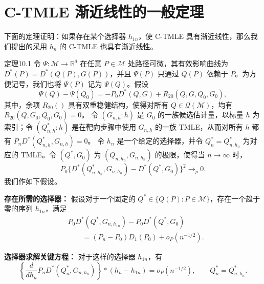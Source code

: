\section{C-TMLE 渐近线性的一般定理}
\label{sec:ch10-asymptotic-linearity}

下面的定理证明：如果存在某个选择器 $h_{1n}$，使 C-TMLE 具有渐近线性，那么我们提出的采用 $h_n$ 的 C-TMLE 也具有渐近线性。

\begin{bookresult}{定理}{10.1}
令 $\Psi:\mathcal M\to\mathbb R^d$ 在任意 $P\in\mathcal M$ 处路径可微，其有效影响曲线为
$D^*(P)=D^*(Q(P),G(P))$，并且 $\Psi(P)$ 只通过 $Q(P)$ 依赖于 $P$。为方便记号，我们也将 $\Psi(P)$ 记为 $\Psi(Q)$。假设
\[
 \Psi(Q)-\Psi(Q_0)
 =-P_0D^*(Q,G)+R_{20}(Q,G,Q_0,G_0),
\]
其中，余项 $R_{20}()$ 具有双重稳健结构，使得对所有 $Q\in\mathcal Q(\mathcal M)$，均有
$R_{20}(Q,G_0,Q_0,G_0)=0$。
令 $(G_{n,h}:h)$ 是 $G_0$ 的一族候选估计量，以标量 $h$ 为索引；令 $(Q_{n,h}^*:h)$ 是在靶向步骤中使用 $G_{n,h}$ 的一族 TMLE，从而对所有 $h$ 都有
$P_nD^*(Q_{n,h}^*,G_{n,h})=0$。
令 $h_n$ 是一个给定的选择器，并令 $Q_n^*=Q_{n,h_n}^*$ 为对应的 TMLE。令 $(Q^*,G_0)$ 为 $(Q_{n,h_n},G_{n,h_n})$ 的极限，使得当 $n\to\infty$ 时，
\[
 P_0\{D^*(Q_{n,h_n}^*,G_{n,h_n})-D^*(Q^*,G_0)\}^2
 \longrightarrow_p0.
\]
我们作如下假设。

\noindent\textbf{存在所需的选择器：}
假设对于一个固定的 $Q^*\in\{Q(P):P\in\mathcal M\}$，存在一个趋于零的序列 $h_{1n}$，满足
\begin{equation}
 \begin{aligned}
 &P_0D^*(Q^*,G_{n,h_{1n}})-P_0D^*(Q^*,G_0)\\
 &\qquad=(P_n-P_0)D_1(P_0)+o_P(n^{-1/2}).
 \end{aligned}
 \tag{10.11}
\end{equation}

\noindent\textbf{选择器求解关键方程：}
对于这样的选择器 $h_{1n}$，有
\begin{equation}
 \left\{\frac{d}{dh_n}P_nD^*(Q_n^*,G_{n,h_n})\right\}
 \ast(h_n-h_{1n})=o_P(n^{-1/2}),
 \qquad Q_n^*=Q_{n,h_n}^*.
 \tag{10.12}
\end{equation}


\end{bookresult}
